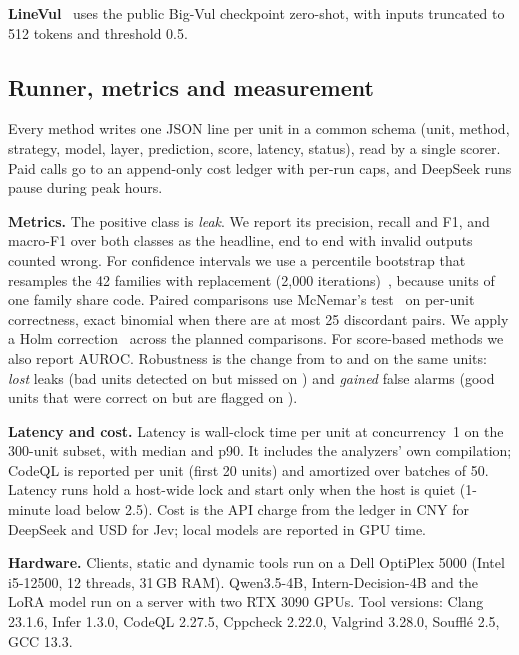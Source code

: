 \noindent\textbf{LineVul}~\cite{fu2022linevul} uses the public Big-Vul checkpoint zero-shot, with inputs truncated to 512 tokens and threshold 0.5.

\subsection{Runner, metrics and measurement}
\label{sec:m-metrics}
Every method writes one JSON line per unit in a common schema (unit, method, strategy, model, layer, prediction, score, latency, status), read by a single scorer.
Paid calls go to an append-only cost ledger with per-run caps, and DeepSeek runs pause during peak hours.

\noindent\textbf{Metrics.}
The positive class is \emph{leak}.
We report its precision, recall and F1, and macro-F1 over both classes as the headline, end to end with invalid outputs counted wrong.
For confidence intervals we use a percentile bootstrap that resamples the 42 families with replacement (2,000 iterations)~\cite{efron1979}, because units of one family share code.
Paired comparisons use McNemar's test~\cite{mcnemar1947} on per-unit correctness, exact binomial when there are at most 25 discordant pairs.
We apply a Holm correction~\cite{holm1979} across the planned comparisons.
For score-based methods we also report AUROC.
Robustness is the change from \Deb{} to \Dead{} and \Plac{} on the same units: \emph{lost} leaks (bad units detected on \Deb{} but missed on \Dead) and \emph{gained} false alarms (good units that were correct on \Deb{} but are flagged on \Dead).

\noindent\textbf{Latency and cost.}
Latency is wall-clock time per unit at concurrency~1 on the 300-unit  subset, with median and p90.
It includes the analyzers' own compilation; CodeQL is reported per unit (first 20 units) and amortized over batches of 50.
Latency runs hold a host-wide lock and start only when the host is quiet (1-minute load below 2.5).
Cost is the API charge from the ledger in CNY for DeepSeek and USD for Jev; local models are reported in GPU time.

\noindent\textbf{Hardware.}
Clients, static and dynamic tools run on a Dell OptiPlex 5000 (Intel i5-12500, 12 threads, 31\,GB RAM). %
Qwen3.5-4B, Intern-Decision-4B and the LoRA model run on a server with two RTX 3090 GPUs.
Tool versions: Clang 23.1.6, Infer 1.3.0, CodeQL 2.27.5, Cppcheck 2.22.0, Valgrind 3.28.0, Souffl\'e 2.5, GCC 13.3. %
